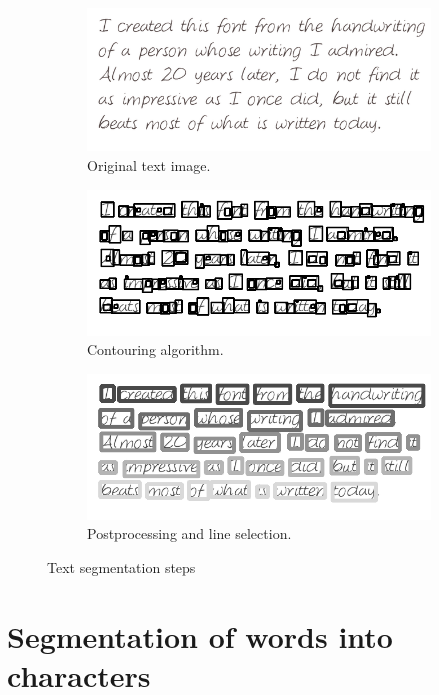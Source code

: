 \documentclass{article}
\begin{document}
\begin{figure}
    \begin{subfigure}{\linewidth}
    \centering
    \includegraphics[width=.7\linewidth]{images/text}
    \vspace{-5px}
    \caption*{Original text image.}
    \end{subfigure}
    \begin{subfigure}{\linewidth}
    \centering
    \includegraphics[width=.7\linewidth]{images/cont}
    \vspace{-5px}
    \caption*{Contouring algorithm.}
    \end{subfigure}
    \begin{subfigure}{\linewidth}
    \centering
    \includegraphics[width=.7\linewidth]{images/lines}
    \vspace{-5px}
    \caption*{Postprocessing and line selection.}
    \end{subfigure}
    \vspace{-10px}
    \caption{Text segmentation steps}
    \label{fig:text_segm}
    \vspace{-20px}
\end{figure}


\section{Segmentation of words into characters}
\label{sec:segword}
\end{document}
